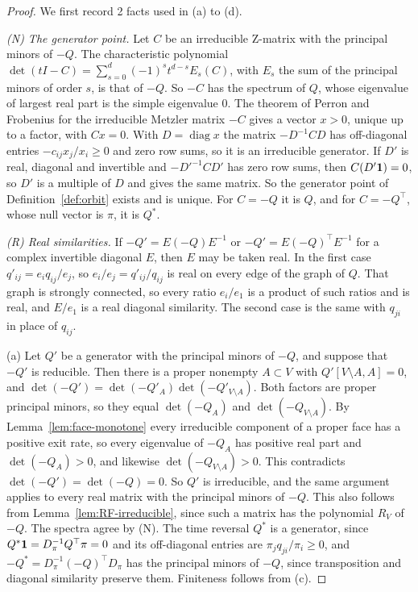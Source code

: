 \begin{proof}
We first record 2 facts used in (a) to (d).

\emph{(N) The generator point.} Let $C$ be an irreducible Z-matrix with the principal
minors of $-Q$. The characteristic polynomial
$\det(tI-C)=\sum_{s=0}^d(-1)^st^{d-s}E_s(C)$, with $E_s$ the sum of the principal minors of
order $s$, is that of $-Q$. So $-C$ has the spectrum of $Q$, whose eigenvalue of largest real
part is the simple eigenvalue $0$. The theorem of Perron and Frobenius for the irreducible
Metzler matrix $-C$ gives a vector $x>0$, unique up to a factor, with $Cx=0$. With
$D=\operatorname{diag}x$ the matrix $-D^{-1}CD$ has off-diagonal entries $-c_{ij}x_j/x_i\ge0$
and zero row sums, so it is an irreducible generator. If $D'$ is real, diagonal and
invertible and $-D'^{-1}CD'$ has zero row sums, then $C(D'\mathbf{1})=0$, so $D'$ is a multiple of
$D$ and gives the same matrix. So the generator point of Definition~\ref{def:orbit} exists and is
unique. For $C=-Q$ it
is $Q$, and for $C=-Q^\top$, whose null vector is $\pi$, it is $Q^*$.

\emph{(R) Real similarities.} If $-Q'=E(-Q)E^{-1}$ or $-Q'=E(-Q)^\top E^{-1}$ for a complex
invertible diagonal $E$, then $E$ may be taken real. In the first case
$q'_{ij}=e_iq_{ij}/e_j$, so $e_i/e_j=q'_{ij}/q_{ij}$ is real on every edge of the graph of
$Q$. That graph is strongly connected, so every ratio $e_i/e_1$ is a product of such ratios
and is real, and $E/e_1$ is a real diagonal similarity. The second case is the same with
$q_{ji}$ in place of $q_{ij}$.

(a) Let $Q'$ be a generator with the principal minors of $-Q$, and suppose that $-Q'$ is
reducible. Then there is a proper nonempty $A\subset V$ with $Q'[V\setminus A,A]=0$, and
$\det(-Q')=\det(-Q'_A)\det(-Q'_{V\setminus A})$. Both factors are proper principal minors,
so they equal $\det(-Q_A)$ and $\det(-Q_{V\setminus A})$. By Lemma~\ref{lem:face-monotone}
every irreducible component of a proper face has a positive exit rate, so every eigenvalue
of $-Q_A$ has positive real part and $\det(-Q_A)>0$, and likewise
$\det(-Q_{V\setminus A})>0$. This contradicts $\det(-Q')=\det(-Q)=0$. So $Q'$ is irreducible,
and the same argument applies to every real matrix with the principal minors of $-Q$. This also
follows from Lemma~\ref{lem:RF-irreducible}, since such a matrix has the polynomial $R_V$ of
$-Q$. The spectra agree by (N). The time reversal $Q^*$ is a generator, since
$Q^*\mathbf{1}=D_\pi^{-1}Q^\top\pi=0$ and its off-diagonal entries are $\pi_jq_{ji}/\pi_i\ge0$,
and $-Q^*=D_\pi^{-1}(-Q)^\top D_\pi$ has the principal minors of $-Q$, since transposition
and diagonal similarity preserve them. Finiteness follows from (c).


\end{proof}
